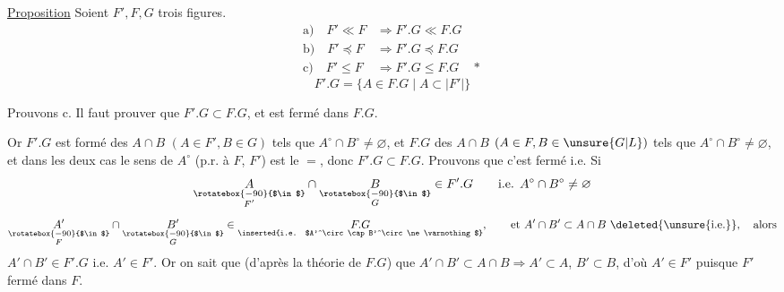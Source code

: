 \uline{Proposition} Soient $F',F,G$ trois figures.
\[
\begin{aligned}
 \text{a)}\quad F'\ll F&\Longrightarrow F'.G\ll F.G\\
 \text{b)}\quad F'\preceq F&\Longrightarrow F'.G\preceq F.G\\
 \text{c)}\quad F'\leq F&\Longrightarrow F'.G\leq F.G\quad *
\end{aligned}
\]
\[
 F'.G=\{A\in F.G\mid A\subset |F'|\}
\]

Prouvons c. Il faut prouver que  $F'.G\subset F.G$, et est fermé dans $F.G$.

 Or $F'.G$ est formé des $A\cap B$ $(A\in F',B\in G)$ tels que $A^\circ\cap B^\circ\ne\varnothing$, et $F.G$ des $A\cap B$ $(A\in F,B\in \unsure{G|L})$ tels que $A^\circ\cap B^\circ\ne\varnothing$, et dans les deux cas le sens de $A^\circ$ (p.r. à $F$,  $F'$) est le $=$, donc $F'.G\subset F.G$. Prouvons que c'est fermé i.e.
Si 
\[
 \underset{\substack{\rotatebox{-90}{$\in$}\\ F'}}{A}\cap
 \underset{\substack{\rotatebox{-90}{$\in$}\\ G}}{B}\in F'.G\qquad
 \text{i.e. } A^\circ\cap B^\circ\ne\varnothing
\]
\[
 \underset{\substack{\rotatebox{-90}{$\in$}\\ F}}{A'}\cap
 \underset{\substack{\rotatebox{-90}{$\in$}\\ G}}{B'}\in\underset{\text{\inserted{i.e. $A'^\circ\cap B'^\circ\ne\varnothing$}}}{F.G},\qquad
 \text{et } A'\cap B'\subset A\cap B\ \deleted{\unsure{\text{i.e.}}},\quad\text{alors}
\]
$A'\cap B'\in F'.G$ i.e. $A'\in F'$. Or on sait que (d'après la théorie de $F.G$) que $A'\cap B'\subset A\cap B\Longrightarrow A'\subset A$, $B'\subset B$, d'où $A'\in F'$ puisque $F'$ fermé dans $F$.


